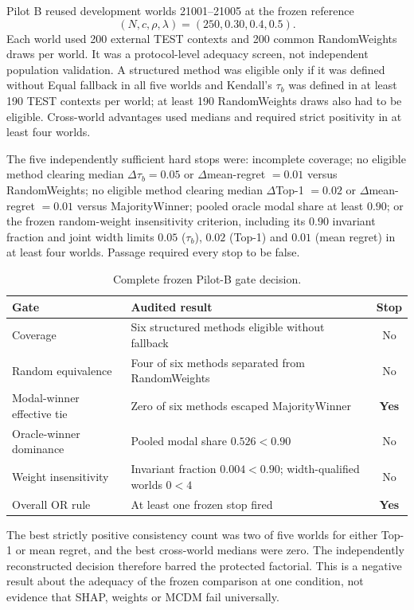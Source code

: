 \documentclass[runningheads]{llncs}
\begin{document}
Pilot B reused development worlds 21001--21005 at the frozen reference
\begin{equation}
(N,c,\rho,\lambda)=(250,0.30,0.4,0.5).
\label{supp:eq:pilotbreference}
\end{equation}
Each world used 200 external TEST contexts and 200 common
RandomWeights draws per world. It was a protocol-level adequacy screen, not independent
population validation. A structured method was eligible only if it was defined without Equal
fallback in all five worlds and Kendall's $\tau_b$ was defined in at least 190 TEST contexts per
world; at least 190 RandomWeights draws also had to be eligible. Cross-world advantages used
medians and required strict positivity in at least four worlds.

The five independently sufficient hard stops were: incomplete coverage; no eligible method
clearing median $\Delta\tau_b=0.05$ or $\Delta$mean-regret $=0.01$ versus RandomWeights; no
eligible method clearing median $\Delta$Top-1 $=0.02$ or $\Delta$mean-regret $=0.01$ versus
MajorityWinner; pooled oracle modal share at least $0.90$; or the frozen random-weight
insensitivity criterion, including its $0.90$ invariant fraction and joint width limits
$0.05$ ($\tau_b$), $0.02$ (Top-1) and $0.01$ (mean regret) in at least four worlds. Passage
required every stop to be false.

\begin{table}[t]
\centering
\caption{Complete frozen Pilot-B gate decision.}
\label{supp:tab:pilotbgates}
\small
\begin{tabularx}{\linewidth}{@{}lXc@{}}
\toprule
Gate & Audited result & Stop\\
\midrule
Coverage & Six structured methods eligible without fallback & No\\
Random equivalence & Four of six methods separated from RandomWeights & No\\
Modal-winner effective tie & Zero of six methods escaped MajorityWinner & \textbf{Yes}\\
Oracle-winner dominance & Pooled modal share $0.526<0.90$ & No\\
Weight insensitivity & Invariant fraction $0.004<0.90$; width-qualified worlds $0<4$ & No\\
\midrule
Overall OR rule & At least one frozen stop fired & \textbf{Yes}\\
\bottomrule
\end{tabularx}
\end{table}

The best strictly positive consistency count was two of five worlds for either Top-1 or mean
regret, and the best cross-world medians were zero. The independently reconstructed decision
therefore barred the protected factorial. This is a negative result about the adequacy of the
frozen comparison at one condition, not evidence that SHAP, weights or MCDM fail universally.
\end{document}
